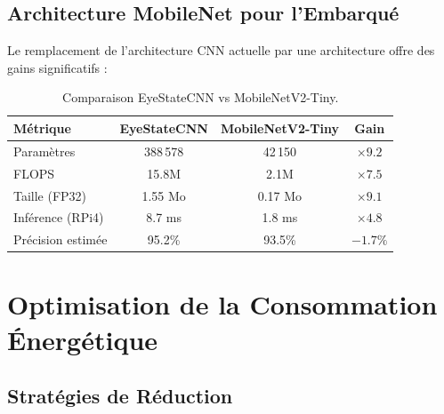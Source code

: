 \subsection{Architecture MobileNet pour l'Embarqué}

Le remplacement de l'architecture CNN actuelle par une architecture  \cite{sandler2018} offre des gains significatifs :

\begin{table}[H]
\centering
\caption{Comparaison EyeStateCNN vs MobileNetV2-Tiny.}
\label{tab:mobilenet_comparison}
\renewcommand{\arraystretch}{1.3}
\begin{tabular}{|l|c|c|c|}
\hline
\rowcolor{stellantisblue!15}
\textbf{Métrique} & \textbf{EyeStateCNN} & \textbf{MobileNetV2-Tiny} & \textbf{Gain} \\
\hline
Paramètres & 388\,578 & 42\,150 & $\times 9.2$ \\
\hline
FLOPS & 15.8M & 2.1M & $\times 7.5$ \\
\hline
Taille (FP32) & 1.55 Mo & 0.17 Mo & $\times 9.1$ \\
\hline
Inférence (RPi4) & 8.7 ms & 1.8 ms & $\times 4.8$ \\
\hline
Précision estimée & 95.2\% & 93.5\% & $-1.7\%$ \\
\hline
\end{tabular}
\end{table}

\section{Optimisation de la Consommation Énergétique}

\subsection{Stratégies de Réduction}

